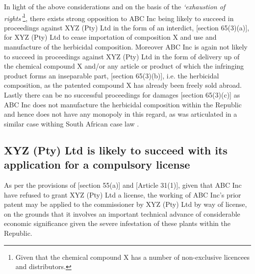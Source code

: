 \documentclass[11pt]{article}
\begin{document}
In light of the above considerations and on the basis of the \emph{`exhaustion of rights'}\footnote{Given that the chemical compound X has a
number of non-exclusive licencees and distributors.}, there exists strong opposition to ABC Inc being likely to succeed in proceedings against XYZ (Pty) Ltd in the
form of an interdict, [section 65(3)(a)]\cite{rsa78_patents_act}, for XYZ (Pty) Ltd to cease importation of composition X and use and
manufacture of the herbicidal composition. Moreover ABC Inc is again not likely to succeed in proceedings against XYZ (Pty) Ltd in
the form of delivery up of the chemical compound X and/or any article or product of which the infringing product forms an inseparable
part, [section 65(3)(b)]\cite{rsa78_patents_act}, i.e. the herbicidal composition, as the patented compound X has already been
freely sold abroad. Lastly there can be no successful proceedings for damages [section 65(3)(c)]\cite{rsa78_patents_act} as ABC Inc
does not manufacture the herbicidal composition within the Republic and hence does not have any monopoly in this regard, as was
articulated in a similar case withing South African case law  \cite{corbett87_stauffer_chem_v_safsan} .

\subsection{XYZ (Pty) Ltd is likely to succeed with its application for a compulsory license}
\label{sec:orgc1e17f1}
As per the provisions of [section 55(a)]\cite{rsa78_patents_act} and [Article 31(1)]\cite{wto17_trips}, given that ABC Inc have
refused to grant XYZ (Pty) Ltd a license, the working of ABC Inc's prior patent may be applied to the commissioner by XYZ (Pty)
Ltd by way of license, on the grounds that it involves an important technical advance of considerable economic significance given
the severe infestation of these plants within the Republic.\\
\end{document}

